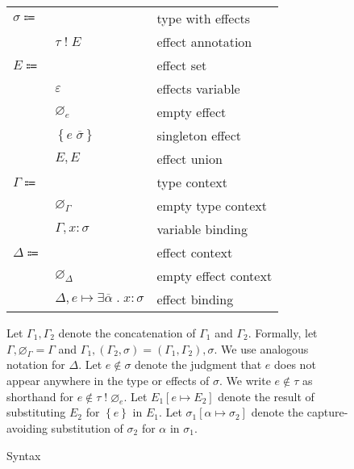 \documentclass[12pt]{article}
\newcommand\parens[1]{\left( #1 \right)} %
\newcommand\lstof[1]{\overline{#1}}
\newcommand\evar{x}
\newcommand\ttype{\tau}
\newcommand\tvar{\alpha}
\newcommand\tanno[2]{#1 : #2} %
\newcommand\tx{\sigma}
\newcommand\twithx[2]{#1 \; ! \; #2} %
\newcommand\tsub[3]{#1 \left[ #2 \mapsto #3 \right]} %
\newcommand\xeffect{e}
\newcommand\xtapp[2]{#1 \; \lstof{#2}}
\newcommand\xvar{\varepsilon}
\newcommand\xsingleton[1]{\left\{#1\right\}}
\newcommand\xeffects{E}
\newcommand\xempty{\varnothing_{\xeffect}}
\newcommand\xunion[2]{#1, #2}
\newcommand\xnotint[2]{#1 \notin #2} %
\newcommand\xsub[3]{#1 \left[ #2 \mapsto #3 \right]} %
\newcommand\ccontext{\Gamma}
\newcommand\cempty{\varnothing_{\ccontext}}
\newcommand\cextend[2]{#1, #2}
\newcommand\cunion[2]{#1, #2}
\newcommand\dcontext{\Delta}
\newcommand\dempty{\varnothing_{\dcontext}}
\newcommand\dextend[2]{#1, #2}
\newcommand\deffect[4]{#1 \mapsto \exists #2 \; . \; \tanno{#3}{#4}} %
\begin{document}
\begin{figure}
\begin{mdframed}[backgroundcolor=none]
\begin{center}
\begin{tabular}{l l l}
          $\tx \Coloneqq$ & & type with effects \\
          & $\twithx{\ttype}{\xeffects}$ & effect annotation \\
          $\xeffects \Coloneqq$ & & effect set \\
          & $\xvar$ & effects variable \\
          & $\xempty$ & empty effect \\
          & $\xsingleton{\xtapp{\xeffect}{\tx}}$ & singleton effect \\
          & $\xunion{\xeffects}{\xeffects}$ & effect union \\
          $\ccontext \Coloneqq$ & & type context \\
          & $\cempty$ & empty type context \\
          & $\cextend{\ccontext}{\tanno{\evar}{\tx}}$ & variable binding \\
          $\dcontext \Coloneqq$ & & effect context \\
          & $\dempty$ & empty effect context \\
          & $\dextend{\dcontext}{\deffect{\xeffect}{\lstof{\tvar}}{\evar}{\tx}}$ & effect binding \\
        \end{tabular}
      \end{center}

      \bigskip

      Let $\cunion{\ccontext_1}{\ccontext_2}$ denote the concatenation of $\ccontext_1$ and $\ccontext_2$. Formally, let $\cunion{\ccontext}{\cempty} = \ccontext$ and $\cunion{\ccontext_1}{\parens{\cextend{\ccontext_2}{\tx}}} = \cextend{\parens{\cunion{\ccontext_1}{\ccontext_2}}}{\tx}$. We use analogous notation for $\dcontext$. Let $\xnotint{\xeffect}{\tx}$ denote the judgment that $\xeffect$ does not appear anywhere in the type or effects of $\tx$. We write $\xnotint{\xeffect}{\ttype}$ as shorthand for $\xnotint{\xeffect}{\twithx{\ttype}{\xempty}}$. Let $\xsub{\xeffects_1}{\xeffect}{\xeffects_2}$ denote the result of substituting $\xeffects_2$ for $\xsingleton{\xeffect}$ in $\xeffects_1$. Let $\tsub{\tx_1}{\tvar}{\tx_2}$ denote the capture-avoiding substitution of $\tx_2$ for $\tvar$ in $\tx_1$.

      \caption{Syntax}\label{fig:syntax}
    \end{mdframed}
  \end{figure}
\end{document}
